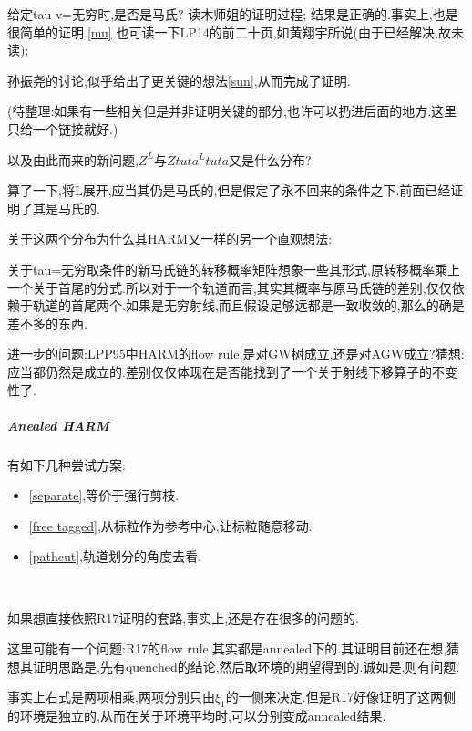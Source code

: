 \documentclass[a4paper,oneside]{ctexbook}
\begin{document}
\begin{que}
							给定tau v=无穷时,是否是马氏?
								读木师姐的证明过程;
									结果是正确的.事实上,也是很简单的证明.\ref{mu}
								也可读一下LP14的前二十页,如黄翔宇所说(由于已经解决,故未读);

							孙振尧的讨论,似乎给出了更关键的想法\ref{sun},从而完成了证明.

								(待整理:如果有一些相关但是并非证明关键的部分,也许可以扔进后面的地方.这里只给一个链接就好.)

								以及由此而来的新问题,$Z^L$与$Ztuta^Ltuta$又是什么分布?

									算了一下,将L展开,应当其仍是马氏的,但是假定了永不回来的条件之下.前面已经证明了其是马氏的.

								关于这两个分布为什么其HARM又一样的另一个直观想法:
								
								关于tau=无穷取条件的新马氏链的转移概率矩阵想象一些其形式,原转移概率乘上一个关于首尾的分式.所以对于一个轨道而言,其实其概率与原马氏链的差别,仅仅依赖于轨道的首尾两个.如果是无穷射线,而且假设足够远都是一致收敛的,那么的确是差不多的东西.

						进一步的问题:LPP95中HARM的flow rule,是对GW树成立,还是对AGW成立?猜想:应当都仍然是成立的.差别仅仅体现在是否能找到了一个关于射线下移算子的不变性了.

								
					\end{que}
	
				\subparagraph*{Anealed HARM}
				\quad

					有如下几种尝试方案:

					\begin{itemize}
						\item \ref{separate},等价于强行剪枝.

						\item \ref{free tagged},从标粒作为参考中心,让标粒随意移动.

						\item \ref{pathcut},轨道划分的角度去看.
					\end{itemize}

					\begin{que}[可能缺乏树的两侧的独立性]
						\label{no indpt}
						\ 

						如果想直接依照R17证明的套路,事实上,还是存在很多的问题的.

						这里可能有一个问题:R17的flow rule.其实都是annealed下的.其证明目前还在想,猜想其证明思路是,先有quenched的结论,然后取环境的期望得到的.诚如是,则有问题.

						事实上右式是两项相乘,两项分别只由$\xi_1$的一侧来决定.但是R17好像证明了这两侧的环境是独立的,从而在关于环境平均时,可以分别变成annealed结果.
					\end{que}
\end{document}
